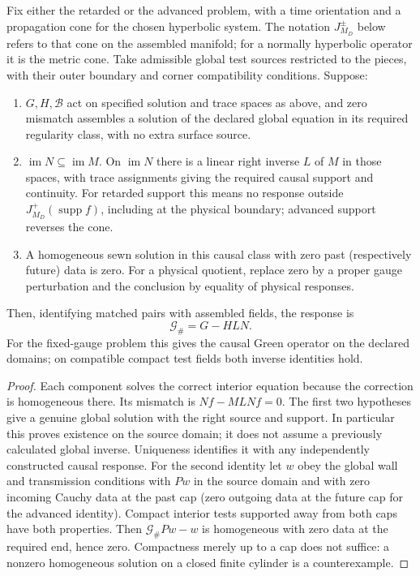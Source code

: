 \begin{proposition}\label{prop:causal}
Fix either the retarded or the advanced problem, with a time orientation and a propagation cone for the chosen hyperbolic system. The notation $J^\pm_{M_D}$ below refers to that cone on the assembled manifold; for a normally hyperbolic operator it is the metric cone. Take admissible global test sources restricted to the pieces, with their outer boundary and corner compatibility conditions. Suppose:
\begin{enumerate}
\item $G,H,\mathcal B$ act on specified solution and trace spaces as above, and zero mismatch assembles a solution of the declared global equation in its required regularity class, with no extra surface source.
\item $\operatorname{im}N\subseteq\operatorname{im}M$. On $\operatorname{im}N$ there is a linear right inverse $L$ of $M$ in those spaces, with trace assignments giving the required causal support and continuity. For retarded support this means no response outside $J^+_{M_D}(\operatorname{supp}f)$, including at the physical boundary; advanced support reverses the cone.
\item A homogeneous sewn solution in this causal class with zero past (respectively future) data is zero. For a physical quotient, replace zero by a proper gauge perturbation and the conclusion by equality of physical responses.
\end{enumerate}
Then, identifying matched pairs with assembled fields, the response is
\begin{equation}
 \mathcal G_\#=G-HLN .\label{eq:causal-sew}
\end{equation}
For the fixed-gauge problem this gives the causal Green operator on the declared domains; on compatible compact test fields both inverse identities hold.
\end{proposition}
\begin{proof}
Each component solves the correct interior equation because the correction is homogeneous there. Its mismatch is $Nf-MLNf=0$. The first two hypotheses give a genuine global solution with the right source and support. In particular this proves existence on the source domain; it does not assume a previously calculated global inverse. Uniqueness identifies it with any independently constructed causal response. For the second identity let $w$ obey the global wall and transmission conditions with $Pw$ in the source domain and with zero incoming Cauchy data at the past cap (zero outgoing data at the future cap for the advanced identity). Compact interior tests supported away from both caps have both properties. Then $\mathcal G_\#Pw-w$ is homogeneous with zero data at the required end, hence zero. Compactness merely up to a cap does not suffice: a nonzero homogeneous solution on a closed finite cylinder is a counterexample.
\end{proof}

